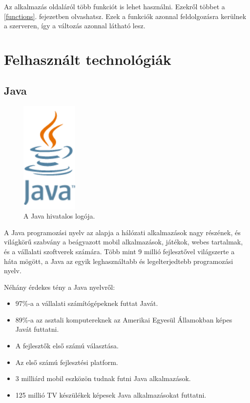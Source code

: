 \documentclass[a4paper,12pt]{report}
\begin{document}
\vspace{2mm}
Az alkalmazás oldaláról több funkciót is lehet használni. Ezekről többet a \ref{functions}. fejezetben olvashatsz. Ezek a funkciók azonnal feldolgozásra kerülnek a szerveren, így a változás azonnal látható lesz.

\newpage
\chapter{Felhasznált technológiák}
\label{technologies}

\section{Java}
\label{java}

\begin{figure}
\centerline{
\includegraphics[width=1.1in]{img/javalogo}}
\caption{A Java hivatalos logója.}
\label{javalogo}
\end{figure}

A Java programozási nyelv az alapja a hálózati alkalmazások nagy részének, és világkörű szabvány a beágyazott mobil alkalmazások, játékok, webes tartalmak, és a vállalati szoftverek számára. Több mint 9 millió fejlesztővel világszerte a háta mögött, a Java az egyik leghasználtabb és legelterjedtebb programozási nyelv. 

\vspace{2mm}
Néhány érdekes tény a Java nyelvről:

\begin{itemize}
\item 97\%-a a vállalati számítógépeknek futtat Javát.
\item 89\%-a az asztali komputereknek az Amerikai Egyesül Államokban képes Javát futtatni.
\item A fejlesztők első számú választása.
\item Az első számú fejlesztési platform.
\item 3 milliárd mobil eszközön tudnak futni Java alkalmazások.
\item 125 millió TV készülékek képesek Java alkalmazásokat futtatni.
\end{itemize}
\end{document}
